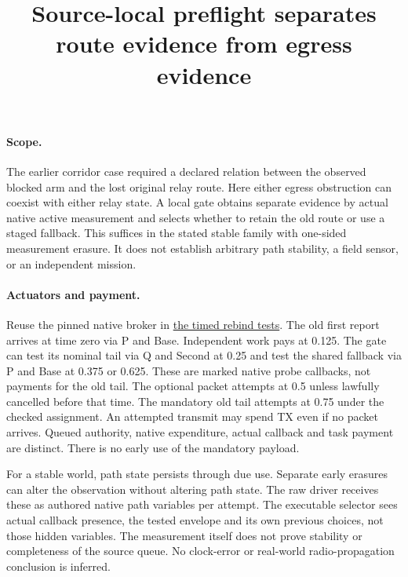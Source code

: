 \documentclass[11pt]{article}
\title{Source-local preflight separates route evidence from egress evidence}
\date{}
\begin{document}
\maketitle
\paragraph{Scope.}
The earlier corridor case required a declared relation between the
observed blocked arm and the lost original relay route. Here either
egress obstruction can coexist with either relay state. A local gate
obtains separate evidence by actual native active measurement and
selects whether to retain the old route or use a staged fallback.
This suffices in the stated stable family with one-sided measurement
erasure. It does not establish arbitrary path stability, a field
sensor, or an independent mission.

\paragraph{Actuators and payment.}
Reuse the pinned native broker in
\href{https://github.com/eternal-november/eos-research-programmes/pull/589}
{the timed rebind tests}. The old first report arrives at time zero
via P and Base. Independent work pays at 0.125. The gate can test
its nominal tail via Q and Second at 0.25 and test the shared
fallback via P and Base at 0.375 or 0.625. These are marked native
probe callbacks, not payments for the old tail. The optional packet
attempts at 0.5 unless lawfully cancelled before that time. The
mandatory old tail attempts at 0.75 under the checked assignment.
An attempted transmit may spend TX even if no packet arrives.
Queued authority, native expenditure, actual callback and task payment
are distinct. There is no early use of the mandatory payload.

For a stable world, path state persists through due use. Separate
early erasures can alter the observation without altering path state.
The raw driver receives these as authored native path variables per
attempt. The executable selector sees actual callback presence,
the tested envelope and its own previous choices, not those hidden
variables. The measurement itself does not prove stability or
completeness of the source queue. No clock-error or real-world
radio-propagation conclusion is inferred.
\end{document}
